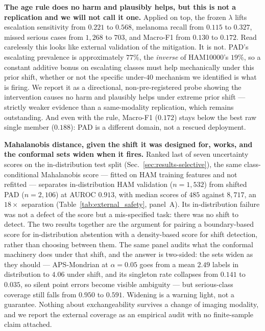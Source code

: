 \documentclass[journal]{IEEEtran}
\begin{document}
\textbf{The age rule does no harm and plausibly helps, but this is not a replication and we
will not call it one.} Applied on top, the frozen $\lambda$ lifts escalation sensitivity from
$0.221$ to $0.568$, melanoma recall from $0.115$ to $0.327$, missed serious cases from
$1{,}268$ to $703$, and Macro-F1 from $0.130$ to $0.172$. Read carelessly this looks like
external validation of the mitigation. It is not. PAD's escalating prevalence is
approximately $77\%$, the \emph{inverse} of HAM10000's $19\%$, so a constant additive bonus on
escalating classes must help mechanically under this prior shift, whether or not the specific
under-$40$ mechanism we identified is what is firing. We report it as a directional,
non-pre-registered probe showing the intervention causes no harm and plausibly helps under
extreme prior shift --- strictly weaker evidence than a same-modality replication, which
remains outstanding. And even with the rule, Macro-F1 ($0.172$) stays below the best raw
single member ($0.188$): PAD is a different domain, not a rescued deployment.

\textbf{Mahalanobis distance, given the shift it was designed for, works, and the conformal
sets widen when it fires.} Ranked last of seven uncertainty scores on the in-distribution
test split (Sec.~\ref{sec:results-selective}), the same class-conditional Mahalanobis score
--- fitted on HAM training features and not refitted --- separates in-distribution HAM
validation ($n=1{,}532$) from shifted PAD ($n=2{,}106$) at AUROC $0.913$, with median scores
of $485$ against $8{,}717$, an $18\times$ separation
(Table~\ref{tab:external_safety}, panel~A). Its in-distribution failure was not a defect of
the score but a mis-specified task: there was no shift to detect. The two results together
are the argument for pairing a boundary-based score for in-distribution abstention with a
density-based score for shift detection, rather than choosing between them. The same panel
audits what the conformal machinery does under that shift, and the answer is two-sided: the
sets widen as they should --- APS-Mondrian at $\alpha=0.05$ goes from a mean $2.49$ labels in
distribution to $4.06$ under shift, and its singleton rate collapses from $0.141$ to $0.035$,
so silent point errors become visible ambiguity --- but serious-class coverage still falls
from $0.950$ to $0.591$. Widening is a warning light, not a guarantee. Nothing about
exchangeability survives a change of imaging modality, and we report the external coverage as
an empirical audit with no finite-sample claim attached.
\end{document}
